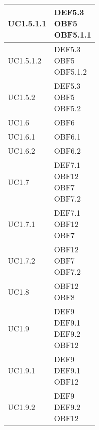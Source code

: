 \documentclass{scalatekids-article}
\begin{document}
\begin{longtable}[H]{|p{5.5cm}|p{5.5cm}|}
  \hline
  UC1.5.1.1 & \multiLineCell[t]{DEF5.3\\OBF5\\OBF5.1.1\\}\\
  \hline
  UC1.5.1.2 & \multiLineCell[t]{DEF5.3\\OBF5\\OBF5.1.2\\}\\
  \hline
  UC1.5.2 & \multiLineCell[t]{DEF5.3\\OBF5\\OBF5.2\\}\\
  \hline
  UC1.6 & \multiLineCell[t]{OBF6\\}\\
  \hline
  UC1.6.1 & \multiLineCell[t]{OBF6.1\\}\\
  \hline
  UC1.6.2 & \multiLineCell[t]{OBF6.2\\}\\
  \hline
  UC1.7 & \multiLineCell[t]{DEF7.1\\OBF12\\OBF7\\OBF7.2\\}\\
  \hline
  UC1.7.1 & \multiLineCell[t]{DEF7.1\\OBF12\\OBF7\\}\\
  \hline
  UC1.7.2 & \multiLineCell[t]{OBF12\\OBF7\\OBF7.2\\}\\
  \hline
  UC1.8 & \multiLineCell[t]{OBF12\\OBF8\\}\\
  \hline
  UC1.9 & \multiLineCell[t]{DEF9\\DEF9.1\\DEF9.2\\OBF12\\}\\
  \hline
  UC1.9.1 & \multiLineCell[t]{DEF9\\DEF9.1\\OBF12\\}\\
  \hline
  UC1.9.2 & \multiLineCell[t]{DEF9\\DEF9.2\\OBF12\\}\\

\end{longtable}
\end{document}
